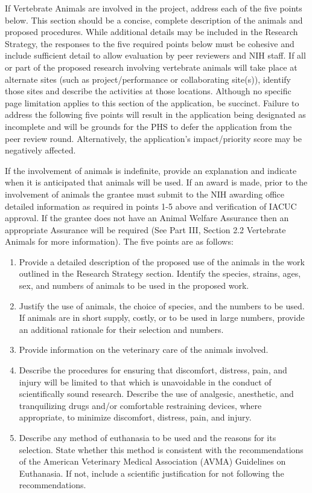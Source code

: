 \documentclass[11pt, notitlepage]{article} %
\begin{document}
If Vertebrate Animals are involved in the project, address each of the five points below. This section should be a concise, complete description of the animals and proposed procedures. While additional details may be included in the Research Strategy, the responses to the five required points below must be cohesive and include sufficient detail to allow evaluation by peer reviewers and NIH staff. If all or part of the proposed research involving vertebrate animals will take place at alternate sites (such as project/performance or collaborating site(s)), identify those sites and describe the activities at those locations. Although no specific page limitation applies to this section of the application, be succinct. Failure to address the following five points will result in the application being designated as incomplete and will be grounds for the PHS to defer the application from the peer review round. Alternatively, the application’s impact/priority score may be negatively affected.

If the involvement of animals is indefinite, provide an explanation and indicate when it is anticipated that animals will be used. If an award is made, prior to the involvement of animals the grantee must submit to the NIH awarding office detailed information as required in points 1-5 above and verification of IACUC approval. If the grantee does not have an Animal Welfare Assurance then an appropriate Assurance will be required (See Part III, Section 2.2 Vertebrate Animals for more information).
The five points are as follows:

\begin{enumerate}
	\item Provide a detailed description of the proposed use of the animals in the work outlined in the Research Strategy section. Identify the species, strains, ages, sex, and numbers of animals to be used in the proposed work.
	\item Justify the use of animals, the choice of species, and the numbers to be used. If animals are in short supply, costly, or to be used in large numbers, provide an additional rationale for their selection and numbers.
	\item Provide information on the veterinary care of the animals involved.
	\item Describe the procedures for ensuring that discomfort, distress, pain, and injury will be limited to that which is unavoidable in the conduct of scientifically sound research. Describe the use of analgesic, anesthetic, and tranquilizing drugs and/or comfortable restraining devices, where appropriate, to minimize discomfort, distress, pain, and injury.
	\item Describe any method of euthanasia to be used and the reasons for its selection. State whether this method is consistent with the recommendations of the American Veterinary Medical Association (AVMA) Guidelines on Euthanasia. If not, include a scientific justification for not following the recommendations.
\end{enumerate}
\end{document}
